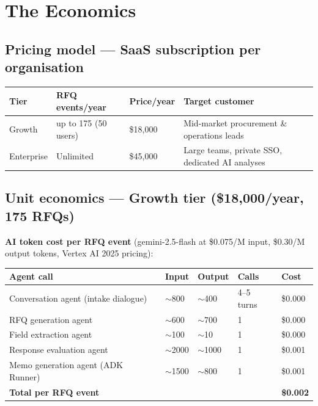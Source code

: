 \documentclass[11pt, a4paper]{article}
\begin{document}
\section{The Economics}

\subsection{Pricing model --- SaaS subscription per organisation}

\smallskip
\begin{center}
\begin{tabular}{L{2.2cm} L{3.2cm} L{2.6cm} L{5.6cm}}
\toprule
{}
\textbf{Tier} & \textbf{RFQ events/year} & \textbf{Price/year} & \textbf{Target customer} \\
\midrule
Growth     & up to 175 (50 users)  & \$18,000 & Mid-market procurement \& operations leads \\
Enterprise & Unlimited             & \$45,000 & Large teams, private SSO, dedicated AI analyses \\
\bottomrule
\end{tabular}
\end{center}

\subsection{Unit economics --- Growth tier (\$18,000/year, 175 RFQs)}

\textbf{AI token cost per RFQ event} (gemini-2.5-flash at \$0.075/M input,
\$0.30/M output tokens, Vertex AI 2025 pricing):

\smallskip
\begin{center}
\begin{tabular}{L{5.2cm} R{1.8cm} R{1.9cm} R{1.8cm} R{1.8cm}}
\toprule
{}
\textbf{Agent call} & \textbf{Input} & \textbf{Output} & \textbf{Calls} & \textbf{Cost} \\
\midrule
Conversation agent (intake dialogue)           & $\sim$800  & $\sim$400  & 4--5 turns & \$0.000 \\
RFQ generation agent                           & $\sim$600  & $\sim$700  & 1          & \$0.000 \\
Field extraction agent                         & $\sim$100  & $\sim$10   & 1          & \$0.000 \\
Response evaluation agent                      & $\sim$2000 & $\sim$1000 & 1          & \$0.001 \\
Memo generation agent (ADK Runner)             & $\sim$1500 & $\sim$800  & 1          & \$0.001 \\
\midrule
\textbf{Total per RFQ event}                   &            &            &            & \textbf{\$0.002} \\
\bottomrule
\end{tabular}
\end{center}
\end{document}
